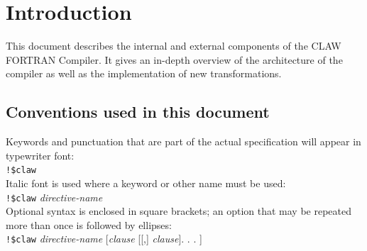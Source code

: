\documentclass[a4paper, 11pt]{report}
\def\clawfcomp{CLAW FORTRAN Compiler\xspace}
\newcommand{\emptypage}{}
\begin{document}
\emptypage
\pagebreak
\tableofcontents

\chapter*{Introduction}
This document describes the internal and external components of the \clawfcomp.
It gives an in-depth overview of the architecture of the compiler as well as
the implementation of new transformations.

\section*{Conventions used in this document}

Keywords and punctuation that are part of the actual specification will appear
in typewriter font: \\

\lstinline|!$claw|\\

Italic font is used where a keyword or other name must be used: \\

\lstinline|!$claw| \textit{directive-name}\\

Optional syntax is enclosed in square brackets; an option that may be repeated
more than once is followed by ellipses:\\

\lstinline|!$claw| \textit{directive-name} [\textit{clause} [[,] \textit{clause}]. . . ]








\pagebreak
\glsaddall
\printglossaries

\emptypage
\pagebreak
\listoffigures

\pagebreak
\listoftables

\emptypage
\pagebreak
\lstlistoflistings





%
\end{document}
